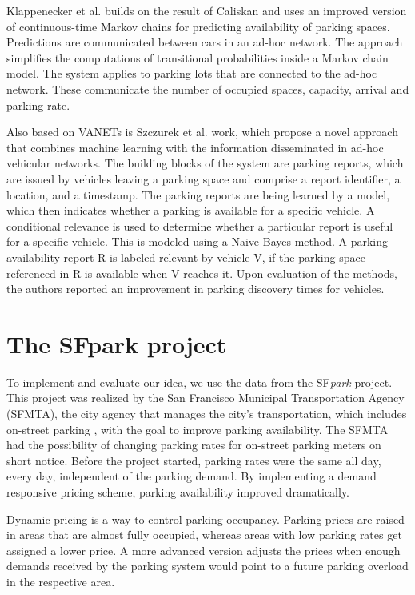 	Klappenecker et al.  builds on the result of Caliskan and uses an improved version of continuous-time Markov chains for predicting availability of parking spaces. Predictions are communicated between cars in an ad-hoc network. The approach simplifies the computations of transitional probabilities inside a Markov chain model. The system applies to parking lots that are connected to the ad-hoc network. These communicate the number of occupied spaces, capacity, arrival and parking rate. 
	
	Also based on VANETs is Szczurek et al.  work, which propose a novel approach that combines machine learning with the information disseminated in ad-hoc vehicular networks. The building blocks of the system are parking reports, which are issued by vehicles leaving a parking space and comprise a report identifier, a location, and a timestamp. The parking reports are being learned by a model, which then indicates whether a parking is available for a specific vehicle. A conditional relevance is used to determine whether a particular report is useful for a specific vehicle. This is modeled using a Naive Bayes method. A parking availability report R is labeled relevant by vehicle V, if the parking space referenced in R is available when V reaches it. Upon evaluation of the methods, the authors reported an improvement in parking discovery times for vehicles.
	
	\section{The SFpark project}
	To implement and evaluate our idea, we use the data from the SF\textit{park} project. This project was realized by the San Francisco Municipal Transportation Agency (SFMTA), the city agency that manages the city's transportation, which includes on-street parking  , with the goal to improve parking availability. The SFMTA had the possibility of changing parking rates for on-street parking meters on short notice. Before the project started, parking rates were the same all day, every day, independent of the parking demand. By implementing a demand responsive pricing scheme, parking availability improved dramatically.
	
	Dynamic pricing is a way to control parking occupancy. Parking prices are raised in areas that are almost fully occupied, whereas areas with low parking rates get assigned a lower price. A more advanced version adjusts the prices when enough demands received by the parking system would point to a future parking overload in the respective area.
	
